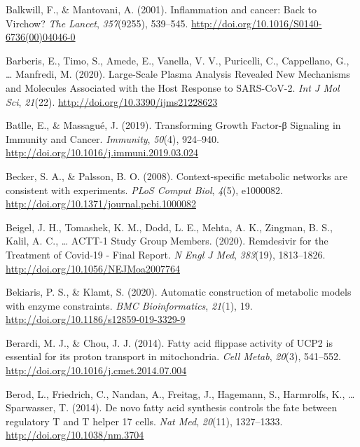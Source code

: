 \documentclass[12pt,twoside,openany,\mydriver]{thesis}  %
\begin{document}
\leavevmode\hypertarget{ref-balkwill_inflammation_2001}{}%
Balkwill, F., \& Mantovani, A. (2001). Inflammation and cancer: Back to Virchow? \emph{The Lancet}, \emph{357}(9255), 539--545. \url{http://doi.org/10.1016/S0140-6736(00)04046-0}

\leavevmode\hypertarget{ref-barberis_large-scale_2020}{}%
Barberis, E., Timo, S., Amede, E., Vanella, V. V., Puricelli, C., Cappellano, G., \ldots{} Manfredi, M. (2020). Large-Scale Plasma Analysis Revealed New Mechanisms and Molecules Associated with the Host Response to SARS-CoV-2. \emph{Int J Mol Sci}, \emph{21}(22). \url{http://doi.org/10.3390/ijms21228623}

\leavevmode\hypertarget{ref-batlle_transforming_2019}{}%
Batlle, E., \& Massagué, J. (2019). Transforming Growth Factor-β Signaling in Immunity and Cancer. \emph{Immunity}, \emph{50}(4), 924--940. \url{http://doi.org/10.1016/j.immuni.2019.03.024}

\leavevmode\hypertarget{ref-becker_context-specific_2008}{}%
Becker, S. A., \& Palsson, B. O. (2008). Context-specific metabolic networks are consistent with experiments. \emph{PLoS Comput Biol}, \emph{4}(5), e1000082. \url{http://doi.org/10.1371/journal.pcbi.1000082}

\leavevmode\hypertarget{ref-beigel_remdesivir_2020}{}%
Beigel, J. H., Tomashek, K. M., Dodd, L. E., Mehta, A. K., Zingman, B. S., Kalil, A. C., \ldots{} ACTT-1 Study Group Members. (2020). Remdesivir for the Treatment of Covid-19 - Final Report. \emph{N Engl J Med}, \emph{383}(19), 1813--1826. \url{http://doi.org/10.1056/NEJMoa2007764}

\leavevmode\hypertarget{ref-bekiaris_automatic_2020}{}%
Bekiaris, P. S., \& Klamt, S. (2020). Automatic construction of metabolic models with enzyme constraints. \emph{BMC Bioinformatics}, \emph{21}(1), 19. \url{http://doi.org/10.1186/s12859-019-3329-9}

\leavevmode\hypertarget{ref-berardi_fatty_2014}{}%
Berardi, M. J., \& Chou, J. J. (2014). Fatty acid flippase activity of UCP2 is essential for its proton transport in mitochondria. \emph{Cell Metab}, \emph{20}(3), 541--552. \url{http://doi.org/10.1016/j.cmet.2014.07.004}

\leavevmode\hypertarget{ref-berod_novo_2014}{}%
Berod, L., Friedrich, C., Nandan, A., Freitag, J., Hagemann, S., Harmrolfs, K., \ldots{} Sparwasser, T. (2014). De novo fatty acid synthesis controls the fate between regulatory T and T helper 17 cells. \emph{Nat Med}, \emph{20}(11), 1327--1333. \url{http://doi.org/10.1038/nm.3704}
\end{document}
